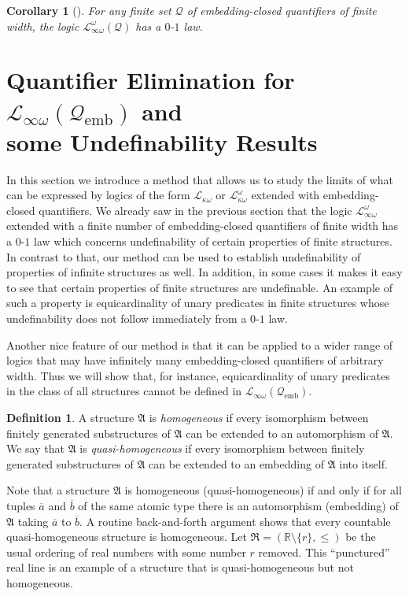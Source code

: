 \documentclass{ndjflart}
\theoremstyle{plain}
\newtheorem{corollary}[conjecture]{Corollary}
\theoremstyle{definition}
\newtheorem{definition}[conjecture]{Definition}
\numberwithin{equation}{section}
\DeclareMathOperator{\emb}{emb}
\begin{document}
\begin{corollary}[\cite{Dawar:2010}]
For any finite set $\mathcal{Q}$ of embedding-closed quantifiers of finite width,
the logic $\mathcal{L}^{\omega}_{\infty\omega}(\mathcal{Q})$ has a $0$-$1$ law.
\end{corollary}


\section{Quantifier Elimination for $\mathcal{L}_{\infty \omega}(\mathcal{Q}_{\emb})$
	and \\ some Undefinability Results}\label{chain_section}

In this section we introduce a method that allows us to study the limits of what
can be expressed by logics of the form
$\mathcal{L}_{\kappa\omega}$ or $\mathcal{L}^{\omega}_{\kappa\omega}$ extended
with embedding-closed quantifiers.
We already saw in the previous section that the logic
$\mathcal{L}_{\infty\omega}^{\omega}$ extended with a finite number of
embedding-closed quantifiers of finite width has a $0$-$1$ law
which concerns undefinability of certain properties of finite structures.
In contrast to that, our method can be used to establish undefinability of
properties of infinite structures as well. In addition, in some cases it makes
it easy to see that certain properties of finite structures are undefinable.
An example of such a property is equicardinality of unary predicates in finite
structures whose undefinability does not follow immediately from a $0$-$1$ law.

Another nice feature of our method is that it can be applied to a wider range of
logics that may have infinitely many embedding-closed quantifiers of arbitrary
width.
Thus we will show that, for instance, equicardinality of unary predicates in the
class of all structures cannot be defined in
$\mathcal{L}_{\infty \omega}(\mathcal{Q}_{\emb})$.

\begin{definition}
A structure $\mathfrak{A}$ is \emph{homogeneous} if every isomorphism between
finitely generated substructures of $\mathfrak{A}$ can be extended to an
automorphism of $\mathfrak{A}$. We say that $\mathfrak{A}$ is
\emph{quasi-homogeneous} if every isomorphism between finitely generated
substructures of $\mathfrak{A}$ can be extended to an embedding of
$\mathfrak{A}$ into itself.
\end{definition}

Note that a structure $\mathfrak{A}$ is homogeneous (quasi-homogeneous) if and
only if for all tuples $\overline{a}$ and $\overline{b}$ of the same atomic type
there is an automorphism (embedding) of $\mathfrak{A}$ taking
$\overline{a}$ to $\overline{b}$.
A routine back-and-forth argument shows that every countable quasi-homogeneous
structure is homogeneous.
Let $\mathfrak{R} = (\mathbb{R} \setminus \{r\}, \leq)$ be the usual ordering of real
numbers with some number $r$ removed.
This ``punctured'' real line is an example of a structure that is
quasi-homogeneous but not homogeneous.
\end{document}
